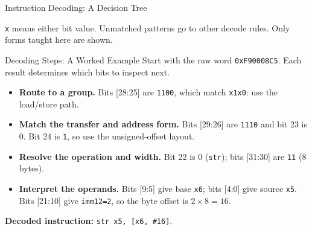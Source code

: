 \documentclass[aspectratio=169,11pt,t]{beamer}
\newcommand{\key}[1]{\textbf{#1}}
\newcommand{\hex}[1]{\texttt{0x#1}}
\newcommand{\code}[1]{\texttt{#1}}
\begin{document}
\begin{frame}{Instruction Decoding: A Decision Tree}
{{}
\par}
\vspace{3pt}
\scriptsize \code{x} means either bit value. Unmatched patterns go to other decode rules. Only forms taught here are shown.
\end{frame}

\begin{frame}{Decoding Steps: A Worked Example}
\small
Start with the raw word \hex{F90008C5}. Each result determines which bits to inspect next.
\begin{itemize}\setlength{\itemsep}{8pt}
\item \key{Route to a group.} Bits [28:25] are \code{1100}, which match \code{x1x0}: use the load/store path.
\item \key{Match the transfer and address form.} Bits [29:26] are \code{1110} and bit 23 is 0. Bit 24 is \code{1}, so use the unsigned-offset layout.
\item \key{Resolve the operation and width.} Bit 22 is 0 (\code{str}); bits [31:30] are \code{11} (8 bytes).
\item \key{Interpret the operands.} Bits [9:5] give base \code{x6}; bits [4:0] give source \code{x5}. Bits [21:10] give \code{imm12=2}, so the byte offset is $2\times8=16$.
\end{itemize}
\key{Decoded instruction:} \code{str x5, [x6, \#16]}.
\end{frame}
\end{document}

